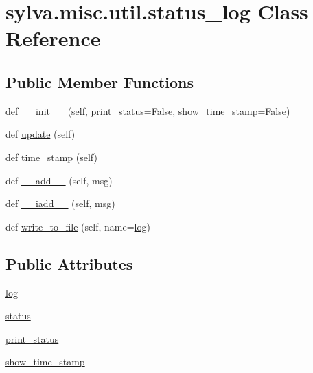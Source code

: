 \hypertarget{classsylva_1_1misc_1_1util_1_1status__log}{}\section{sylva.\+misc.\+util.\+status\+\_\+log Class Reference}
\label{classsylva_1_1misc_1_1util_1_1status__log}
\subsection*{Public Member Functions}
\begin{DoxyCompactItemize}
\item 
def \hyperlink{classsylva_1_1misc_1_1util_1_1status__log_ab7c946f90680f9a4460404cf7c64f126}{\+\_\+\+\_\+init\+\_\+\+\_\+} (self, \hyperlink{classsylva_1_1misc_1_1util_1_1status__log_a6bed7b9c7fffc5bf27401ddf0481a71d}{print\+\_\+status}=False, \hyperlink{classsylva_1_1misc_1_1util_1_1status__log_a799f3dda1ada1a55c9febe98843c5ec6}{show\+\_\+time\+\_\+stamp}=False)
\item 
def \hyperlink{classsylva_1_1misc_1_1util_1_1status__log_a285cc969af6cbc0e41a20e38db9a6196}{update} (self)
\item 
def \hyperlink{classsylva_1_1misc_1_1util_1_1status__log_a4e8a754367e04626ca986457b1e5c770}{time\+\_\+stamp} (self)
\item 
def \hyperlink{classsylva_1_1misc_1_1util_1_1status__log_ab98f2dd8f3108204d97d0415ab838f96}{\+\_\+\+\_\+add\+\_\+\+\_\+} (self, msg)
\item 
def \hyperlink{classsylva_1_1misc_1_1util_1_1status__log_ab13cd7b4f04bc397105042ebfb34cfaa}{\+\_\+\+\_\+iadd\+\_\+\+\_\+} (self, msg)
\item 
def \hyperlink{classsylva_1_1misc_1_1util_1_1status__log_a8785c236977e889558120ddd31d9b2e6}{write\+\_\+to\+\_\+file} (self, name=\textquotesingle{}\hyperlink{classsylva_1_1misc_1_1util_1_1status__log_ab581acbcedf70a8afe11c96ea003e951}{log}\textquotesingle{})
\end{DoxyCompactItemize}
\subsection*{Public Attributes}
\begin{DoxyCompactItemize}
\item 
\hyperlink{classsylva_1_1misc_1_1util_1_1status__log_ab581acbcedf70a8afe11c96ea003e951}{log}
\item 
\hyperlink{classsylva_1_1misc_1_1util_1_1status__log_a8e25853177439515a92f83c533247b46}{status}
\item 
\hyperlink{classsylva_1_1misc_1_1util_1_1status__log_a6bed7b9c7fffc5bf27401ddf0481a71d}{print\+\_\+status}
\item 
\hyperlink{classsylva_1_1misc_1_1util_1_1status__log_a799f3dda1ada1a55c9febe98843c5ec6}{show\+\_\+time\+\_\+stamp}
\end{DoxyCompactItemize}



